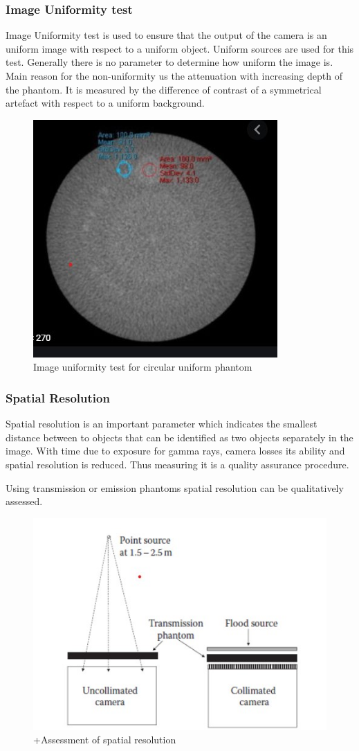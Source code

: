 \documentclass[12pt]{article}
\begin{document}
\subsubsection{Image Uniformity test}
Image Uniformity test is used to ensure that the output of the camera is an uniform image with respect to a uniform object. Uniform sources are used for this test. Generally there is no parameter to determine how uniform the image is. Main reason for the non-uniformity us the attenuation with increasing depth of the phantom. It is measured by the difference of contrast of a symmetrical artefact with respect to a uniform background. 
\begin{figure}[h!]
    \centering
    \includegraphics[width=0.45\linewidth]{iu.jpg}
    \caption{\small{Image uniformity test for circular uniform phantom}}
    \label{fig:Image uniformity test for circular uniform phantom}
\end{figure}


\subsubsection{Spatial Resolution}
Spatial resolution is an important parameter which indicates the smallest distance between to objects that can be identified as two objects separately in the image. With time due to exposure for gamma rays, camera losses its ability and spatial resolution is reduced. Thus measuring it is a quality assurance procedure. 

Using transmission or emission phantoms spatial resolution can be qualitatively assessed. 
\begin{figure}[h!]
    \centering
    \includegraphics[width=0.65\linewidth]{spa.jpg}
    \caption{\small{+Assessment of spatial resolution}}
    \label{fig:Assessment of spatial resolution}
\end{figure}
\end{document}
